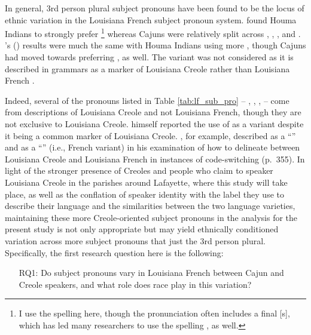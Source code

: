     In general, 3rd person plural subject pronouns have been found to be the locus of ethnic variation in the Louisiana French subject pronoun system.
    \textcite{rottet_language_1995} found Houma Indians to strongly prefer \footnote{
      I use the spelling  here, though the pronunciation often includes a final [s], which has led many researchers to use the spelling , as well.
    } whereas Cajuns were relatively split across , , , and .
    \citeauthor{dajko_ethnic_2009}'s (\citeyear{dajko_ethnic_2009}) results were much the same with Houma Indians using more , though Cajuns had moved towards preferring , as well.
    The variant  was not considered as it is described in grammars as a marker of Louisiana Creole rather than Louisiana French \parencite{klingler_if_2003, neumann_creole_1985}.

    Indeed, several of the pronouns listed in Table \ref{tab:lf_sub_pro} -- , , ,  -- come from descriptions of Louisiana Creole and not Louisiana French, though they are not exclusive to Louisiana Creole.
    \textcite{rottet_language_1995} himself reported the use of  as a variant despite it being a common marker of Louisiana Creole.
    \textcite{klingler_probleme_2005}, for example, described  as a ``''  and  as a ``''  (i.e., French variant) in his examination of how to delineate between Louisiana Creole and Louisiana French in instances of code-switching (p.~355).
    In light of the stronger presence of Creoles and people who claim to speaker Louisiana Creole in the parishes around Lafayette, where this study will take place, as well as the conflation of speaker identity with the label they use to describe their language and the similarities between the two language varieties, maintaining these more Creole-oriented subject pronouns in the analysis for the present study is not only appropriate but may yield ethnically conditioned variation across more subject pronouns that just the 3rd person plural.
    Specifically, the first research question here is the following:
    \begin{itemize}
      \item[RQ1:] Do subject pronouns vary in Louisiana French between Cajun and Creole speakers, and what role does race play in this variation?
    \end{itemize}


